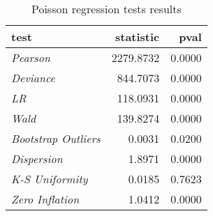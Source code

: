 \begin{table}[H]

\caption{\label{tab:poisson_reg_tests}Poisson regression tests results}
\centering
\begin{tabular}[t]{>{}l|r|r}
\hline
test & statistic & pval\\
\hline
\em{Pearson} & 2279.8732 & 0.0000\\
\hline
\em{Deviance} & 844.7073 & 0.0000\\
\hline
\em{LR} & 118.0931 & 0.0000\\
\hline
\em{Wald} & 139.8274 & 0.0000\\
\hline
\em{Bootstrap Outliers} & 0.0031 & 0.0200\\
\hline
\em{Dispersion} & 1.8971 & 0.0000\\
\hline
\em{K-S Uniformity} & 0.0185 & 0.7623\\
\hline
\em{Zero Inflation} & 1.0412 & 0.0000\\
\hline
\end{tabular}
\end{table}
